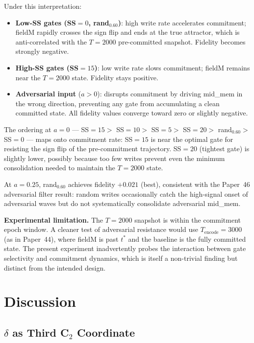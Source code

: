 \documentclass[11pt,a4paper]{article}
\begin{document}
Under this interpretation:
\begin{itemize}
  \item \textbf{Low-SS gates (SS$=0$, rand$_{0.60}$)}: high write rate
        accelerates commitment; fieldM rapidly crosses the sign flip and ends
        at the true attractor, which is anti-correlated with the $T=2000$
        pre-committed snapshot.  Fidelity becomes strongly negative.
  \item \textbf{High-SS gates (SS$=15$)}: low write rate slows commitment;
        fieldM remains near the $T=2000$ state.  Fidelity stays positive.
  \item \textbf{Adversarial input} ($a > 0$): disrupts commitment by driving
        mid\_mem in the wrong direction, preventing any gate from accumulating
        a clean committed state.  All fidelity values converge toward zero or
        slightly negative.
\end{itemize}

The ordering at $a=0$ --- SS$=15 >$ SS$=10 >$ SS$=5 >$ SS$=20 >$
rand$_{0.60} >$ SS$=0$ --- maps onto commitment rate: SS$=15$ is near the
optimal gate for resisting the sign flip of the pre-commitment trajectory.
SS$=20$ (tightest gate) is slightly lower, possibly because too few writes
prevent even the minimum consolidation needed to maintain the $T=2000$ state.

At $a=0.25$, rand$_{0.60}$ achieves fidelity $+0.021$ (best), consistent with
the Paper~46 adversarial filter result: random writes occasionally catch the
high-signal onset of adversarial waves but do not systematically consolidate
adversarial mid\_mem.

\textbf{Experimental limitation.}  The $T=2000$ snapshot is within the
commitment epoch window.  A cleaner test of adversarial resistance would use
$T_\text{encode} = 3000$ (as in Paper~44), where fieldM is past $t^*$ and the
baseline is the fully committed state.  The present experiment inadvertently
probes the interaction between gate selectivity and commitment dynamics, which
is itself a non-trivial finding but distinct from the intended design.

\section{Discussion}

\subsection{$\delta$ as Third C$_2$ Coordinate}
\end{document}
